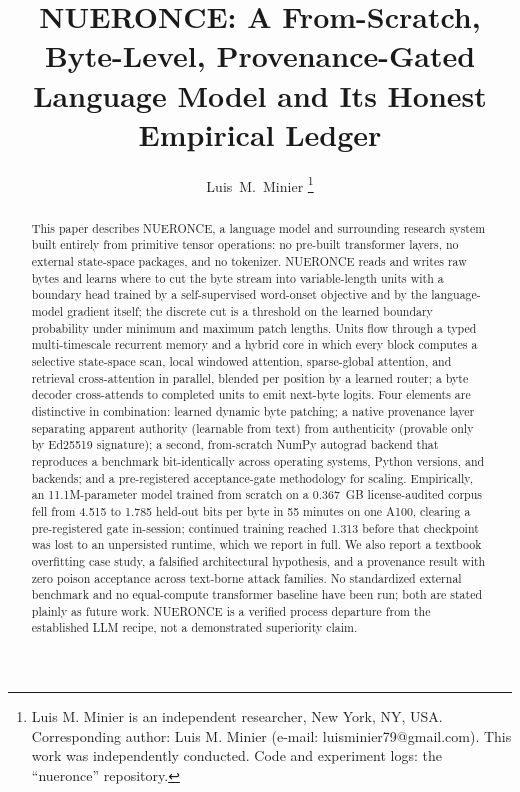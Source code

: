 \documentclass[journal]{IEEEtran}
\begin{document}
\title{NUERONCE: A From-Scratch, Byte-Level, Provenance-Gated\\
       Language Model and Its Honest Empirical Ledger}

\author{Luis~M.~Minier%
\thanks{Luis M. Minier is an independent researcher, New York, NY, USA.
        Corresponding author: Luis M. Minier (e-mail: luisminier79@gmail.com).
        This work was independently conducted. Code and experiment logs:
        the ``nueronce'' repository.}}

\maketitle

\begin{abstract}
This paper describes NUERONCE, a language model and surrounding research system built entirely from primitive tensor operations: no pre-built transformer layers, no external state-space packages, and no tokenizer. NUERONCE reads and writes raw bytes and learns where to cut the byte stream into variable-length units with a boundary head trained by a self-supervised word-onset objective and by the language-model gradient itself; the discrete cut is a threshold on the learned boundary probability under minimum and maximum patch lengths. Units flow through a typed multi-timescale recurrent memory and a hybrid core in which every block computes a selective state-space scan, local windowed attention, sparse-global attention, and retrieval cross-attention in parallel, blended per position by a learned router; a byte decoder cross-attends to completed units to emit next-byte logits. Four elements are distinctive in combination: learned dynamic byte patching; a native provenance layer separating apparent authority (learnable from text) from authenticity (provable only by Ed25519 signature); a second, from-scratch NumPy autograd backend that reproduces a benchmark bit-identically across operating systems, Python versions, and backends; and a pre-registered acceptance-gate methodology for scaling. Empirically, an 11.1M-parameter model trained from scratch on a 0.367~GB license-audited corpus fell from 4.515 to 1.785 held-out bits per byte in 55 minutes on one A100, clearing a pre-registered gate in-session; continued training reached 1.313 before that checkpoint was lost to an unpersisted runtime, which we report in full. We also report a textbook overfitting case study, a falsified architectural hypothesis, and a provenance result with zero poison acceptance across text-borne attack families. No standardized external benchmark and no equal-compute transformer baseline have been run; both are stated plainly as future work. NUERONCE is a verified process departure from the established LLM recipe, not a demonstrated superiority claim.
\end{abstract}
\end{document}
